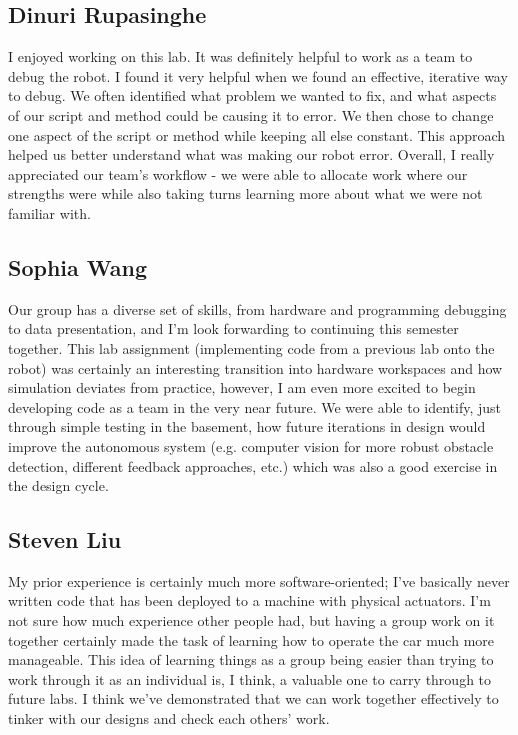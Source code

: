 \documentclass{article}
\begin{document}
\subsection{Dinuri Rupasinghe}
I enjoyed working on this lab. It was definitely helpful to work as a team to debug the robot. I found it very helpful when we found an effective, iterative way to debug. We often identified what problem we wanted to fix, and what aspects of our script and method could be causing it to error. We then chose to change one aspect of the script or method while keeping all else constant. This approach helped us better understand what was making our robot error. Overall, I really appreciated our team's workflow - we were able to allocate work where our strengths were while also taking turns learning more about what we were not familiar with.

\subsection{Sophia Wang}
Our group has a diverse set of skills, from hardware and programming debugging to data presentation, and I'm look forwarding to continuing this semester together. This lab assignment (implementing code from a previous lab onto the robot) was certainly an interesting transition into hardware workspaces and how simulation deviates from practice, however, I am even more excited to begin developing code as a team in the very near future. We were able to identify, just through simple testing in the basement, how future iterations in design would improve the autonomous system (e.g. computer vision for more robust obstacle detection, different feedback approaches, etc.) which was also a good exercise in the design cycle.

\subsection{Steven Liu}
My prior experience is certainly much more software-oriented; I've basically never written code that has been deployed to a machine with physical actuators. I'm not sure how much experience other people had, but having a group work on it together certainly made the task of learning how to operate the car much more manageable. This idea of learning things as a group being easier than trying to work through it as an individual is, I think, a valuable one to carry through to future labs. I think we've demonstrated that we can work together effectively to tinker with our designs and check each others' work.
\end{document}
